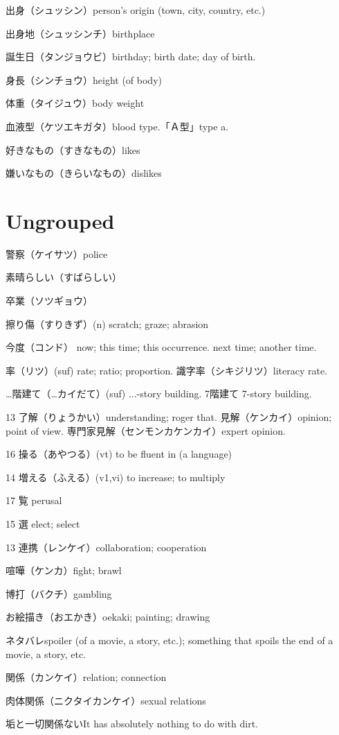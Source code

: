 出身（シュッシン）person's origin (town, city, country, etc.)

出身地（シュッシンチ）birthplace

誕生日（タンジョウビ）birthday; birth date; day of birth.

身長（シンチョウ）height (of body)

体重（タイジュウ）body weight

血液型（ケツエキガタ）blood type.「Ａ型」type a.

好きなもの（すきなもの）likes

嫌いなもの（きらいなもの）dislikes

\section{Ungrouped}

警察（ケイサツ）police

素晴らしい（すばらしい）

卒業（ソツギョウ）

擦り傷（すりきず）(n) scratch; graze; abrasion

今度（コンド）
now; this time; this occurrence.
next time; another time.

率（リツ）(suf) rate; ratio; proportion.
識字率（シキジリツ）literacy rate.

…階建て（…カイだて）(suf) ...-story building.
7階建て 7-story building.

13
了解（りょうかい）understanding; roger that.
見解（ケンカイ）opinion; point of view.
専門家見解（センモンカケンカイ）expert opinion.

16 操る（あやつる）(vt) to be fluent in (a language)

14 増える（ふえる）(v1,vi) to increase; to multiply

17 覧 perusal

15 選 elect; select

13 連携（レンケイ）collaboration; cooperation

喧嘩（ケンカ）fight; brawl

博打（バクチ）gambling

お絵描き（おエかき）oekaki; painting; drawing

ネタバレspoiler (of a movie, a story, etc.); something that spoils the end of a movie, a story, etc.

関係（カンケイ）relation; connection

肉体関係（ニクタイカンケイ）sexual relations

垢と一切関係ないIt has absolutely nothing to do with dirt.
